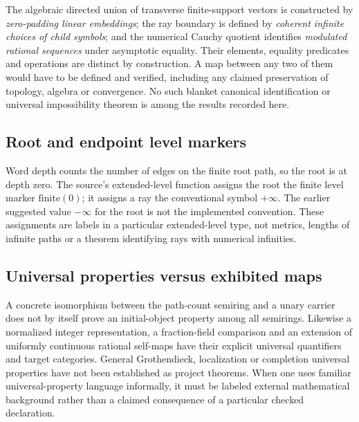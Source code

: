 The algebraic directed union of transverse finite-support vectors is constructed by \emph{zero-padding linear embeddings}; the ray boundary is defined by \emph{coherent infinite choices of child symbols}; and the numerical Cauchy quotient identifies \emph{modulated rational sequences} under asymptotic equality. Their elements, equality predicates and operations are distinct by construction. A map between any two of them would have to be defined and verified, including any claimed preservation of topology, algebra or convergence. No such blanket canonical identification or universal impossibility theorem is among the results recorded here.

\subsection{Root and endpoint level markers}\label{supp:15-4}
\par{}\par\smallskip

Word depth counts the number of edges on the finite root path, so the root is at depth zero. The source's extended-level function assigns the root the finite level marker $\mathrm{finite}(0)$; it assigns a ray the conventional symbol $+\infty$. The earlier suggested value $-\infty$ for the root is not the implemented convention. These assignments are labels in a particular extended-level type, not metrics, lengths of infinite paths or a theorem identifying rays with numerical infinities.

\subsection{Universal properties versus exhibited maps}\label{supp:16-1}
\par{}\par\smallskip

A concrete isomorphism between the path-count semiring and a unary carrier does not by itself prove an initial-object property among all semirings. Likewise a normalized integer representation, a fraction-field comparison and an extension of uniformly continuous rational self-maps have their explicit universal quantifiers and target categories. General Grothendieck, localization or completion universal properties have not been established as project theorems. When one uses familiar universal-property language informally, it must be labeled external mathematical background rather than a claimed consequence of a particular checked declaration.

